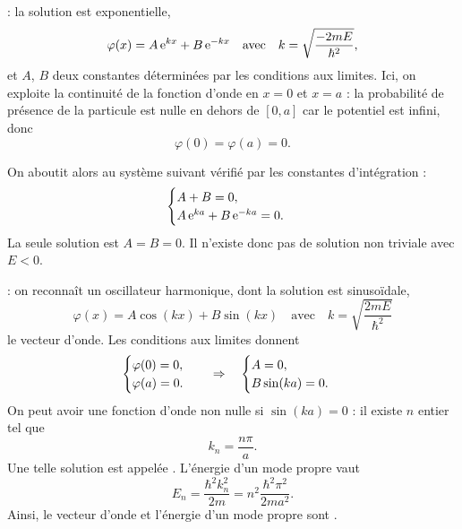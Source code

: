 \documentclass[12pt,fancy]{cours}
\begin{document}
\begin{liste}
  \item {} : la solution est exponentielle,
 \begin{equation}
 \varphi(x)=A\,\mathrm{e}^{k x}+B\,\mathrm{e}^{-k x}\quad\text{avec}\quad k=\sqrt{\frac{-2mE}{\hbar^2}},
 \end{equation}
 et $A$, $B$ deux constantes déterminées par les conditions aux limites. Ici, on exploite la continuité de la fonction d'onde en $x=0$ et $x=a$ : la probabilité de présence de la particule est nulle en dehors de $[0,a]$ car le potentiel est infini, donc
 \begin{equation}
 \varphi(0)=\varphi(a)=0.
 \label{eqn:cls_puits_inf}
 \end{equation}

 On aboutit alors au système suivant vérifié par les constantes d'intégration :
 \begin{equation}
 \begin{cases}
 A+B=0,\\
 A\,\mathrm{e}^{ka}+ B\,\mathrm{e}^{-ka}=0.
 \end{cases}
 \end{equation}
 La seule solution est $A=B=0$. Il n'existe donc pas de solution non triviale avec $E<0$. %
\item {} : on reconnaît un oscillateur harmonique, dont la solution est sinusoïdale,
\begin{equation}
\varphi(x)=A\cos(kx)+B\sin(kx)\quad\text{avec}\quad k=\sqrt{\frac{2mE}{\hbar^2}}
\end{equation}
le vecteur d'onde.
Les conditions aux limites donnent
\begin{equation}
  \begin{cases}
  \varphi(0)=0,\\
  \varphi(a)=0.
  \end{cases}
 \quad \Rightarrow \quad    \begin{cases}
   A=0,\\
   B\sin(ka)=0.
   \end{cases}
\end{equation}
On peut avoir une fonction d'onde non nulle si $\sin(ka)=0$ : il existe $n$ entier tel que
\begin{equation}
k_n=\frac{n\pi}{a}.
\end{equation}
Une telle solution est appelée .
L'énergie d'un mode propre vaut
\begin{equation}
E_n=\frac{\hbar^2 k_n^2}{2m}=n^2\frac{\hbar^2\pi^2}{2ma^2}.
\end{equation}
Ainsi, le vecteur d'onde et l'énergie d'un mode propre sont .
%
\end{liste}
\end{document}
